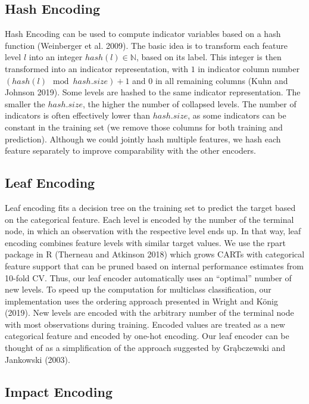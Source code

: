 \documentclass[smallextended]{svjour3}       %
\begin{document}
\hypertarget{hash-encoding}{%
\subsection{Hash Encoding}\label{hash-encoding}}

Hash Encoding can be used to compute indicator variables based on a hash function (Weinberger et al. 2009).
The basic idea is to transform each feature level \(l\) into an integer \(hash(l) \in \mathbb{N}\), based on its label.
This integer is then transformed into an indicator representation, with \(1\) in indicator column number \((hash(l) \mod hash.size) + 1\) and \(0\) in all remaining columns (Kuhn and Johnson 2019).
Some levels are hashed to the same indicator representation.
The smaller the \(hash.size\), the higher the number of collapsed levels.
The number of indicators is often effectively lower than \(hash.size\), as some indicators can be constant in the training set (we remove those columns for both training and prediction).
Although we could jointly hash multiple features, we hash each feature separately to improve comparability with the other encoders.

\hypertarget{leaf-encoding}{%
\subsection{Leaf Encoding}\label{leaf-encoding}}

Leaf encoding fits a decision tree on the training set to predict the target based on the categorical feature.
Each level is encoded by the number of the terminal node, in which an observation with the respective level ends up.
In that way, leaf encoding combines feature levels with similar target values.
We use the rpart package in R (Therneau and Atkinson 2018) which grows CARTs with categorical feature support that can be pruned based on internal performance estimates from 10-fold CV.
Thus, our leaf encoder automatically uses an ``optimal'' number of new levels.
To speed up the computation for multiclass classification, our implementation uses the ordering approach presented in Wright and König (2019).
New levels are encoded with the arbitrary number of the terminal node with most observations during training.
Encoded values are treated as a new categorical feature and encoded by one-hot encoding.
Our leaf encoder can be thought of as a simplification of the approach suggested by Grąbczewski and Jankowski (2003).

\hypertarget{impact-encoding}{%
\subsection{Impact Encoding}\label{impact-encoding}}
\end{document}
